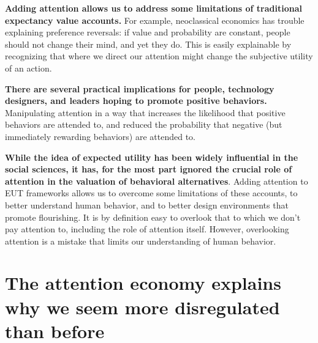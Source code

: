 \documentclass[letterpaper, 12pt]{article}
\begin{document}
\textbf{Adding attention allows us to address some limitations of traditional expectancy value accounts.} For example, neoclassical economics has trouble explaining preference reversals: if value and probability are constant, people should not change their mind, and yet they do. This is easily explainable by recognizing that where we direct our attention might change the subjective utility of an action.

\textbf{There are several practical implications for people, technology designers, and leaders hoping to promote positive behaviors.} Manipulating attention in a way that increases the likelihood that positive behaviors are attended to, and reduced the probability that negative (but immediately rewarding behaviors) are attended to.

\textbf{While the idea of expected utility has been widely influential in the social sciences, it has, for the most part ignored the crucial role of attention in the valuation of behavioral alternatives}. Adding attention to EUT frameworks allows us to overcome some limitations of these accounts, to better understand human behavior, and to better design environments that promote flourishing. It is by definition easy to overlook that to which we don't pay attention to, including the role of attention itself. However, overlooking attention is a mistake that limits our understanding of human behavior.

\section{The attention economy explains why we seem more disregulated than before}

\footnotesize


\end{document}
